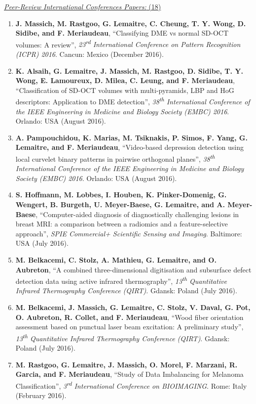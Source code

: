{\underline{\textit{Peer-Review International Conferences Papers:} (18)}

\begin{enumerate}
\item \textbf{J. Massich, M. Rastgoo, G. Lemaitre, C. Cheung, T. Y. Wong, D. Sidibe, and F. Meriaudeau}, ``Classifying DME vs normal SD-OCT volumes: A review'', \textit{23\textsuperscript{rd} International Conference on Pattern Recognition (ICPR) 2016}. Cancun: Mexico (December 2016).
\item \textbf{K. Alsaih, G. Lemaitre, J. Massich, M. Rastgoo, D. Sidibe, T. Y. Wong, E. Lamoureux, D. Milea, C. Leung, and F. Meriaudeau}, ``Classification of SD-OCT volumes with multi-pyramids, LBP and HoG descriptors: Application to DME detection'', \textit{38\textsuperscript{th} International Conference of the IEEE Engineering in Medicine and Biology Society (EMBC) 2016}. Orlando: USA (August 2016).
\item \textbf{A. Pampouchidou, K. Marias, M. Tsiknakis, P. Simos, F. Yang, G. Lemaitre, and F. Meriaudeau}, ``Video-based depression detection using local curvelet binary patterns in pairwise orthogonal planes'', \textit{38\textsuperscript{th} International Conference of the IEEE Engineering in Medicine and Biology Society (EMBC) 2016}. Orlando: USA (August 2016).
\item \textbf{S. Hoffmann, M. Lobbes, I. Houben, K. Pinker-Domenig, G. Wengert, B. Burgeth, U. Meyer-Baese, G. Lemaitre, and A. Meyer-Baese}, ``Computer-aided diagnosis of diagnostically challenging lesions in breast MRI: a comparison between a radiomics and a feature-selective approach'', \textit{SPIE Commercial+ Scientific Sensing and Imaging}. Baltimore: USA (July 2016).
\item \textbf{M. Belkacemi, C. Stolz, A. Mathieu, G. Lemaitre, and O. Aubreton}, ``A combined three-dimensional digitisation and subsurface defect detection data using active infrared thermography'', \textit{13\textsuperscript{th} Quantitative Infrared Thermography Conference (QIRT)}. Gdansk: Poland (July 2016).
\item \textbf{M. Belkacemi, J. Massich, G. Lemaitre, C. Stolz, V. Daval, G. Pot, O. Aubreton, R. Collet, and F. Meriaudeau}, ``Wood fiber orientation assessment based on punctual laser beam excitation: A preliminary study'', \textit{13\textsuperscript{th} Quantitative Infrared Thermography Conference (QIRT)}. Gdansk: Poland (July 2016).
\item \textbf{M. Rastgoo, G. Lemaitre, J. Massich, O. Morel, F. Marzani, R. Garcia, and F. Meriaudeau}, ``Study of Data Imbalancing for Melanoma Classification'', \textit{3\textsuperscript{rd} International Conference on BIOIMAGING}. Rome: Italy (February 2016).

\end{enumerate}}
